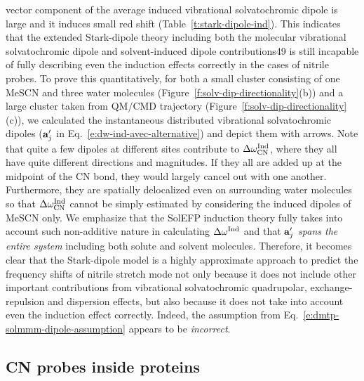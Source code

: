 \documentclass[a4paper,titlepage,twoside,fleqn,12pt]{book}
\begin{document}
\begin{refsection}
vector component of the average induced vibrational
solvatochromic dipole is large and it induces small red shift
(Table~\ref{t:stark-dipole-ind}). This indicates that the extended Stark\hyp{}dipole theory
including both the molecular vibrational solvatochromic dipole
and solvent\hyp{}induced dipole contributions49 is still incapable of
fully describing even the induction effects correctly in the
cases of nitrile probes. To prove this quantitatively, for both a
small cluster consisting of one MeSCN and three water
molecules (Figure~\ref{f:solv-dip-directionality}(b)) and a large cluster taken from QM/CMD
trajectory (Figure~\ref{f:solv-dip-directionality}(c)), we calculated the instantaneous distributed
vibrational solvatochromic dipoles (${\bf a}_j'$ in Eq.~\eqref{e:dw-ind-avec-alternative}) 
and depict
them with arrows. 
%
Note that quite a few dipoles at different
sites contribute to $\Delta\omega_{\rm CN}^{\rm Ind}$, 
where they all have quite different
directions and magnitudes. If they all are added up at the midpoint
of the CN bond, they would largely cancel out with one
another. Furthermore, they are spatially delocalized even on
surrounding water molecules so that $\Delta\omega_{\rm CN}^{\rm Ind}$
cannot be simply
estimated by considering the induced dipoles of MeSCN only.
We emphasize that the SolEFP induction theory fully takes into
account such non\hyp{}additive nature in calculating $\Delta\omega^{\rm Ind}$ 
and that
${\bf a}_j'$ \emph{spans the entire system} including both solute and solvent
molecules.\citep{Blasiak.Cho.JCP.2014} 
Therefore, it becomes clear that the Stark\hyp{}dipole
model is a highly approximate approach to predict the
frequency shifts of nitrile stretch mode not only because it
does not include other important contributions from
vibrational solvatochromic quadrupolar, exchange\hyp{}repulsion
and dispersion effects, but also because it does not take into
account even the induction effect correctly. Indeed, the assumption
from Eq.~\eqref{e:dmtp-solmmm-dipole-assumption} appears to be \emph{incorrect}.

\subsection{CN probes inside proteins}


\end{refsection}
\end{document}
